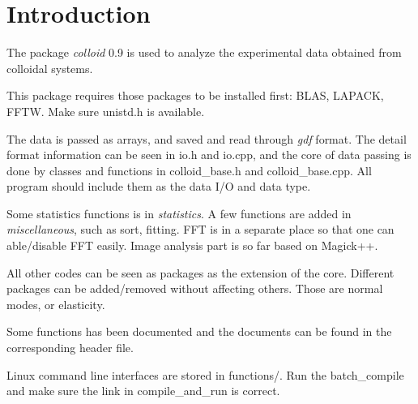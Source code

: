 \chapter{Introduction}
The package \emph{colloid} 0.9 is used to analyze the experimental data obtained from colloidal systems.

This package requires those packages to be installed first: BLAS, LAPACK, FFTW. Make sure unistd.h is available.

The data is passed as arrays, and saved and read through \emph{gdf} format. The detail format information can be seen in io.h and io.cpp, and the core of data passing is done by classes and functions in colloid\_base.h and colloid\_base.cpp. All program should include them as the data I/O and data type.

Some statistics functions is in \emph{statistics}. A few functions are added in \emph{miscellaneous}, such as sort, fitting. FFT is in a separate place so that one can able/disable FFT easily. Image analysis part is so far based on Magick++.

All other codes can be seen as packages as the extension of the core. Different packages can be added/removed without affecting others. Those are normal modes, or elasticity.

Some functions has been documented and the documents can be found in the corresponding header file.

Linux command line interfaces are stored in functions/. Run the batch\_compile and make sure the link in compile\_and\_run is correct.
